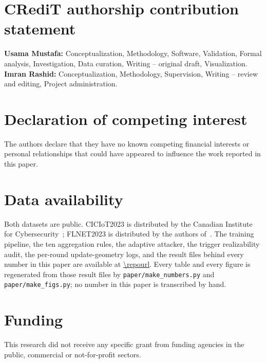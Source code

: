 
\section*{CRediT authorship contribution statement}

\textbf{Usama Mustafa:} Conceptualization, Methodology, Software,
Validation, Formal analysis, Investigation, Data curation, Writing --
original draft, Visualization.
\textbf{Imran Rashid:} Conceptualization, Methodology, Supervision,
Writing -- review and editing, Project administration.

\section*{Declaration of competing interest}

The authors declare that they have no known competing financial
interests or personal relationships that could have appeared to
influence the work reported in this paper.

\section*{Data availability}

Both datasets are public. CICIoT2023 is distributed by the Canadian
Institute for Cybersecurity~\cite{neto2023ciciot}; FLNET2023 is
distributed by the authors of~\cite{flnet2023}. The training pipeline,
the ten aggregation rules, the adaptive attacker, the trigger
realizability audit, the per-round update-geometry logs, and the result
files behind every number in this paper are available at
\url{\repourl}. Every table and every figure is regenerated from those
result files by \texttt{paper/make\_numbers.py} and
\texttt{paper/make\_figs.py}; no number in this paper is transcribed by
hand.

\section*{Funding}

This research did not receive any specific grant from funding agencies
in the public, commercial or not-for-profit sectors.
